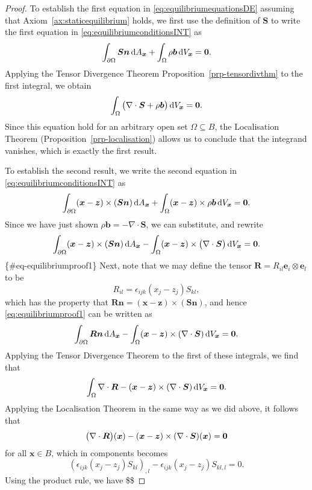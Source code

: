 \documentclass[
  letterpaper,
  DIV=11,
  numbers=noendperiod]{scrreprt}
\theoremstyle{plain}
\theoremstyle{remark}
\begin{document}
\begin{proof}
To establish the first equation in
\hyperref[eq:equilibriumequationsDE]{{[}eq:equilibriumequationsDE{]}}
assuming that
Axiom~\hyperref[ax:staticequilibrium]{{[}ax:staticequilibrium{]}} holds,
we first use the definition of \({\boldsymbol{S}}\) to write the first
equation in
\hyperref[eq:equilibriumconditionsINT]{{[}eq:equilibriumconditionsINT{]}}
as
\[\int_{\partial \Omega}{\boldsymbol{S}}{\boldsymbol{n}}{\,{\mathrm{d}}A_{{\boldsymbol{x}}}}+\int_\Omega\rho{\boldsymbol{b}}{\,{\mathrm{d}}V_{{\boldsymbol{x}}}}=\bf0.\]
Applying the Tensor Divergence Theorem
Proposition~\ref{prp-tensordivthm} to the first integral, we obtain
\[\int_\Omega \big(\nabla\cdot{\boldsymbol{S}}+\rho{\boldsymbol{b}}\big){\,{\mathrm{d}}V_{{\boldsymbol{x}}}}=\bf0.\]
Since this equation hold for an arbitrary open set
\(\Omega\subseteq B\), the Localisation Theorem
(Proposition~\ref{prp-localisation}) allows us to conclude that the
integrand vanishes, which is exactly the first result.

To establish the second result, we write the second equation in
\hyperref[eq:equilibriumconditionsINT]{{[}eq:equilibriumconditionsINT{]}}
as
\[\int_{\partial\Omega} ({\boldsymbol{x}}-{\boldsymbol{z}})\times ({\boldsymbol{S}}{\boldsymbol{n}}){\,{\mathrm{d}}A_{{\boldsymbol{x}}}}+\int_\Omega ({\boldsymbol{x}}-{\boldsymbol{z}})\times\rho{\boldsymbol{b}}{\,{\mathrm{d}}V_{{\boldsymbol{x}}}}=\bf0.\]
Since we have just shown
\(\rho{\boldsymbol{b}}=-\nabla\cdot{\boldsymbol{S}}\), we can
substitute, and rewrite \[
    \int_{\partial\Omega} ({\boldsymbol{x}}-{\boldsymbol{z}})\times ({\boldsymbol{S}}{\boldsymbol{n}}){\,{\mathrm{d}}A_{{\boldsymbol{x}}}}-\int_\Omega ({\boldsymbol{x}}-{\boldsymbol{z}})\times\big(\nabla\cdot{\boldsymbol{S}}\big){\,{\mathrm{d}}V_{{\boldsymbol{x}}}}=\bf0.\]
\{\#eq-equilibriumproof1\} Next, note that we may define the tensor
\({\boldsymbol{R}}=R_{il}{\boldsymbol{e}}_i\otimes{\boldsymbol{e}}_l\)
to be \[R_{il} = \epsilon_{ijk}(x_j-z_j)S_{kl},\] which has the property
that
\({\boldsymbol{R}}{\boldsymbol{n}}=({\boldsymbol{x}}-{\boldsymbol{z}})\times({\boldsymbol{S}}{\boldsymbol{n}})\),
and hence \hyperref[eq:equilibriumproof1]{{[}eq:equilibriumproof1{]}}
can be written as
\[\int_{\partial\Omega}{\boldsymbol{R}}{\boldsymbol{n}}{\,{\mathrm{d}}A_{{\boldsymbol{x}}}}-\int_\Omega ({\boldsymbol{x}}-{\boldsymbol{z}})\times(\nabla\cdot {\boldsymbol{S}}){\,{\mathrm{d}}V_{{\boldsymbol{x}}}}=\bf0.\]
Applying the Tensor Divergence Theorem to the first of these integrals,
we find that
\[\int_\Omega\nabla\cdot {\boldsymbol{R}}- ({\boldsymbol{x}}-{\boldsymbol{z}})\times(\nabla\cdot {\boldsymbol{S}}){\,{\mathrm{d}}V_{{\boldsymbol{x}}}}=\bf0.\]
Applying the Localisation Theorem in the same way as we did above, it
follows that
\[\big(\nabla\cdot{\boldsymbol{R}}\big)({\boldsymbol{x}})-({\boldsymbol{x}}-{\boldsymbol{z}})\times(\nabla\cdot{\boldsymbol{S}})({\boldsymbol{x}})=\bf0\]
for all \({\boldsymbol{x}}\in B\), which in components becomes
\[(\epsilon_{ijk}(x_j-z_j)S_{kl})_{,l}-\epsilon_{ijk}(x_j-z_j)S_{kl,l}=0.\]
Using the product rule, we have \$\$


\end{proof}
\end{document}
